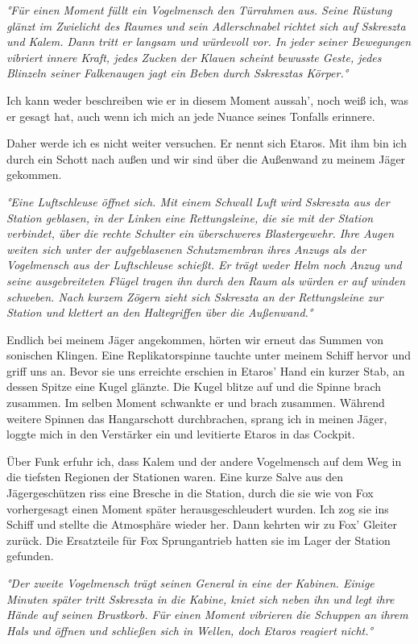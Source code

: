 \documentclass[11pt]{article}
\begin{document}
\emph{°Für einen Moment füllt ein Vogelmensch den Türrahmen aus. Seine
Rüstung glänzt im Zwielicht des Raumes und sein Adlerschnabel richtet
sich auf Sskreszta und Kalem. Dann tritt er langsam und würdevoll vor.
In jeder seiner Bewegungen vibriert innere Kraft, jedes Zucken der
Klauen scheint bewusste Geste, jedes Blinzeln seiner Falkenaugen jagt
ein Beben durch Sskresztas Körper.°}

Ich kann weder beschreiben wie er in diesem Moment aussah', noch weiß
ich, was er gesagt hat, auch wenn ich mich an jede Nuance seines
Tonfalls erinnere.

Daher werde ich es nicht weiter versuchen. Er nennt sich Etaros. Mit ihm
bin ich durch ein Schott nach außen und wir sind über die Außenwand zu
meinem Jäger gekommen.

\emph{°Eine Luftschleuse öffnet sich. Mit einem Schwall Luft wird
Sskreszta aus der Station geblasen, in der Linken eine Rettungsleine,
die sie mit der Station verbindet, über die rechte Schulter ein
überschweres Blastergewehr. Ihre Augen weiten sich unter der
aufgeblasenen Schutzmembran ihres Anzugs als der Vogelmensch aus der
Luftschleuse schießt. Er trägt weder Helm noch Anzug und seine
ausgebreiteten Flügel tragen ihn durch den Raum als würden er auf winden
schweben. Nach kurzem Zögern zieht sich Sskreszta an der Rettungsleine
zur Station und klettert an den Haltegriffen über die Außenwand.°}

Endlich bei meinem Jäger angekommen, hörten wir erneut das Summen von
sonischen Klingen. Eine Replikatorspinne tauchte unter meinem Schiff
hervor und griff uns an. Bevor sie uns erreichte erschien in Etaros'
Hand ein kurzer Stab, an dessen Spitze eine Kugel glänzte. Die Kugel
blitze auf und die Spinne brach zusammen. Im selben Moment schwankte er
und brach zusammen. Während weitere Spinnen das Hangarschott
durchbrachen, sprang ich in meinen Jäger, loggte mich in den Verstärker
ein und levitierte Etaros in das Cockpit.

Über Funk erfuhr ich, dass Kalem und der andere Vogelmensch auf dem Weg
in die tiefsten Regionen der Stationen waren. Eine kurze Salve aus den
Jägergeschützen riss eine Bresche in die Station, durch die sie wie von
Fox vorhergesagt einen Moment später herausgeschleudert wurden. Ich zog
sie ins Schiff und stellte die Atmosphäre wieder her. Dann kehrten wir
zu Fox' Gleiter zurück. Die Ersatzteile für Fox Sprungantrieb hatten sie
im Lager der Station gefunden.

\emph{°Der zweite Vogelmensch trägt seinen General in eine der Kabinen.
Einige Minuten später tritt Sskreszta in die Kabine, kniet sich neben
ihn und legt ihre Hände auf seinen Brustkorb. Für einen Moment vibrieren
die Schuppen an ihrem Hals und öffnen und schließen sich in Wellen, doch
Etaros reagiert nicht.°}
\end{document}
